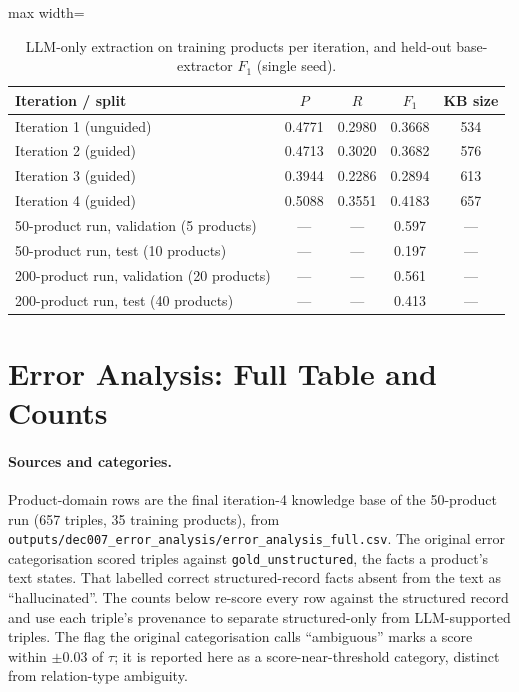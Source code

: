 \documentclass[11pt]{article}
\begin{document}
\begin{table}[htbp]
\centering
\caption{LLM-only extraction on training products per iteration, and
held-out base-extractor $F_1$ (single seed).}
\label{tab:s2-iteration}
\begin{adjustbox}{max width=\textwidth}
\begin{tabular}{@{}lcccc@{}}
\toprule
Iteration / split & $P$ & $R$ & $F_1$ & KB size \\
\midrule
Iteration 1 (unguided) & 0.4771 & 0.2980 & 0.3668 & 534 \\
Iteration 2 (guided) & 0.4713 & 0.3020 & 0.3682 & 576 \\
Iteration 3 (guided) & 0.3944 & 0.2286 & 0.2894 & 613 \\
Iteration 4 (guided) & 0.5088 & 0.3551 & 0.4183 & 657 \\
50-product run, validation (5 products) & --- & --- & 0.597 & --- \\
50-product run, test (10 products) & --- & --- & 0.197 & --- \\
200-product run, validation (20 products) & --- & --- & 0.561 & --- \\
200-product run, test (40 products) & --- & --- & 0.413 & --- \\
\bottomrule
\end{tabular}
\end{adjustbox}
\end{table}

\section{Error Analysis: Full Table and Counts}
\label{sec:s9}

\paragraph{Sources and categories.} Product-domain rows are the final
iteration-4 knowledge base of the 50-product run (657 triples, 35 training
products), from \texttt{outputs/dec007\_error\_analysis/error\_analysis\_full.csv}.
The original error categorisation scored triples against
\texttt{gold\_unstructured}, the facts a product's text states. That
labelled correct structured-record facts absent from the text as
``hallucinated''. The counts below re-score every row against the
structured record and use each triple's provenance to separate
structured-only from LLM-supported triples. The flag the original categorisation calls
``ambiguous'' marks a score within $\pm0.03$ of $\tau$; it is reported
here as a score-near-threshold category, distinct from relation-type
ambiguity.
\end{document}
